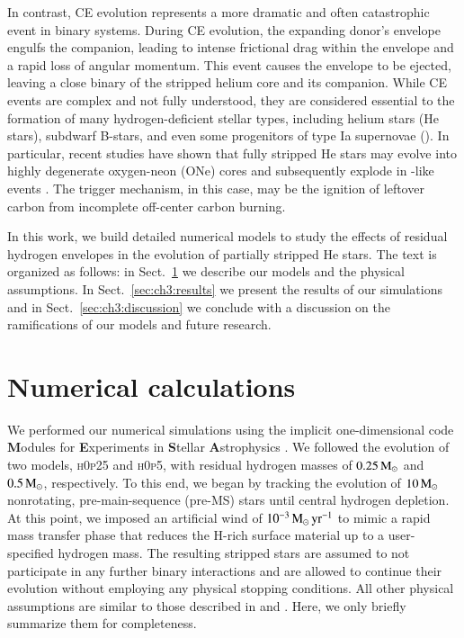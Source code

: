\documentclass[main.tex]{subfiles}
\begin{document}
    In contrast, CE evolution represents a more dramatic and often catastrophic event in binary systems. During CE evolution, the expanding donor’s envelope engulfs the companion, leading to intense frictional drag within the envelope and a rapid loss of angular momentum. This event causes the envelope to be ejected, leaving a close binary of the stripped helium core and its companion. While CE events are complex and not fully understood, they are considered essential to the formation of many hydrogen-deficient stellar types, including helium stars (He stars), subdwarf B-stars, and even some progenitors of type Ia supernovae (\ias). In particular, recent studies have shown that fully stripped He stars may evolve into highly degenerate oxygen-neon (ONe) cores and subsequently explode in \ia-like events \citep{AC20, CA22}. The trigger mechanism, in this case, may be the ignition of leftover carbon from incomplete off-center carbon burning. 

    In this work, we build detailed numerical models to study the effects of residual hydrogen envelopes in the evolution of partially stripped He stars. The text is organized as follows: in Sect.~\ref{sec:ch3:methods} we describe our models and the physical assumptions. In Sect.~\ref{sec:ch3:results} we present the results of our simulations and in Sect.~\ref{sec:ch3:discussion} we conclude with a discussion on the ramifications of our models and future research.

    \section{Numerical calculations} \label{sec:ch3:methods}
    We performed our numerical simulations using the implicit one-dimensional code \textbf{M}odules for \textbf{E}xperiments in \textbf{S}tellar \textbf{A}strophysics \citep[\mesa\,v10398;][]{Paxton:2010ji,Paxton:2013pj,Paxton:2015jva,Paxton:2017eie}.
    We followed the evolution of two models, \textsc{h0p25} and \textsc{h0p5}, with residual hydrogen masses of $0.25\mathrm{\,M_\odot}$ and $0.5\mathrm{\,M_\odot}$, respectively. To this end, we began by tracking the evolution of $10\mathrm{\,M_\odot}$ nonrotating, pre-main-sequence (pre-MS) stars until central hydrogen depletion. At this point, we imposed an artificial wind of $10^{-3}\mathrm{\,M_{\odot}\,yr^{-1}}$ to mimic a rapid mass transfer phase that reduces the H-rich surface material up to a user-specified hydrogen mass. The resulting stripped stars are assumed to not participate in any further binary interactions and are allowed to continue their evolution without employing any physical stopping conditions. All other physical assumptions are similar to those described in \cite{AC20} and \cite{CA22}. Here, we only briefly summarize them for completeness.
    
\end{document}
